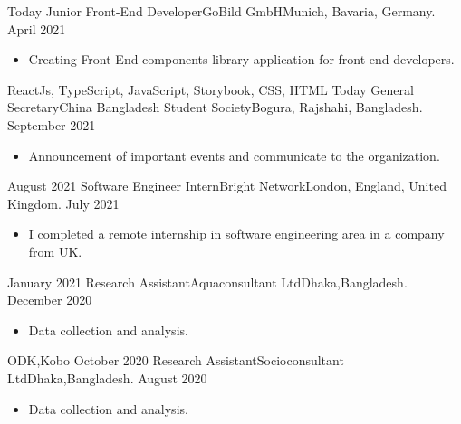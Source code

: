 \break
\break
{}
\begin{experiences}
  \experience
    {Today}   {Junior Front-End Developer}{GoBild GmbH}{Munich, Bavaria, Germany.}
    {April 2021} {
                      \begin{itemize}
                        \item Creating Front End components library application for front end developers.
                        
                      \end{itemize}
                    }
                    {ReactJs, TypeScript, JavaScript, Storybook, CSS, HTML}
  \emptySeparator
  \experience
    {Today}   {General Secretary}{China Bangladesh Student Society}{Bogura, Rajshahi, Bangladesh.}
    {September 2021} {
                      \begin{itemize}
                        \item Announcement of important events and communicate to the organization.
                        
                      \end{itemize}
                    }
                    {}
  \emptySeparator
  \experience
    {August 2021} {Software Engineer Intern}{Bright
    Network}{London, England, United Kingdom.}
    {July 2021}    {
                      \begin{itemize}
                        \item I completed a remote internship in software engineering area in a company from UK.                                                                
                      \end{itemize}
                    }
                    {}
  \emptySeparator
  \experience
    {January 2021} {Research Assistant}{Aquaconsultant Ltd}{Dhaka,Bangladesh.}
    {December 2020}    {
                      \begin{itemize}
                        \item Data collection and analysis.                                                                
                      \end{itemize}
                    }
                    {ODK,Kobo}
  \emptySeparator
  \experience
    {October 2020}     {Research Assistant}{Socioconsultant Ltd}{Dhaka,Bangladesh.}
    {August 2020}    {
                      \begin{itemize}
                        \item Data collection and analysis. 
                        

\end{itemize}}
\end{experiences}
